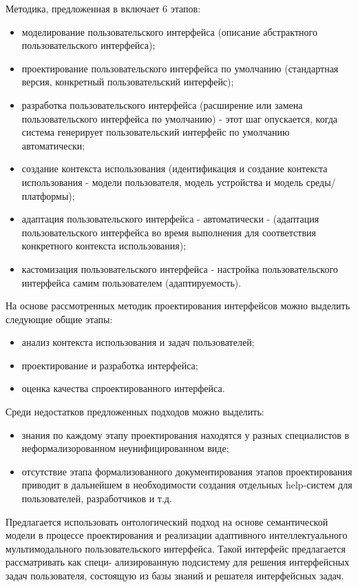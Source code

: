 Методика, предложенная в \cite{design_multi_adaptive} включает 6 этапов:
\begin{itemize}
	\item моделирование пользовательского интерфейса (описание абстрактного пользовательского интерфейса);
	\item проектирование пользовательского интерфейса по умолчанию (стандартная версия, конкретный пользовательский интерфейс);
	\item разработка пользовательского интерфейса (расширение или замена пользовательского интерфейса по умолчанию) - этот шаг опускается, когда система генерирует пользовательский интерфейс по умолчанию автоматически;
	\item создание контекста использования (идентификация и создание контекста использования - модели пользователя, модель устройства и модель среды/платформы);
	\item адаптация пользовательского интерфейса - автоматически - (адаптация пользовательского интерфейса во время выполнения для соответствия конкретного контекста использования);
	\item кастомизация пользовательского интерфейса - настройка пользовательского интерфейса самим пользователем (адаптируемость).
\end{itemize}

На основе рассмотренных методик проектирования интерфейсов можно выделить следующие общие этапы:
\begin{itemize}
\item анализ контекста использования и задач пользователей;
\item проектирование и разработка интерфейса;
\item оценка качества спроектированного интерфейса.
\end{itemize}

Среди недостатков предложенных подходов можно выделить:
\begin{itemize}
	\item знания по каждому этапу проектирования находятся у разных специалистов в неформализорованном неунифицированном виде;
	\item отсутствие этапа формализованного документирования этапов проектирования приводит в дальнейшем в необходимости создания отдельных help-систем для пользователей, разработчиков и т.д.
\end{itemize}

Предлагается использовать онтологический подход на основе семантической модели в процессе проектирования и реализации адаптивного интеллектуального мультимодального пользовательского интерфейса. Такой интерфейс предлагается рассматривать как специ-
ализированную подсистему для решения интерфейсных задач пользователя, состоящую из базы знаний и решателя интерфейсных задач. 

